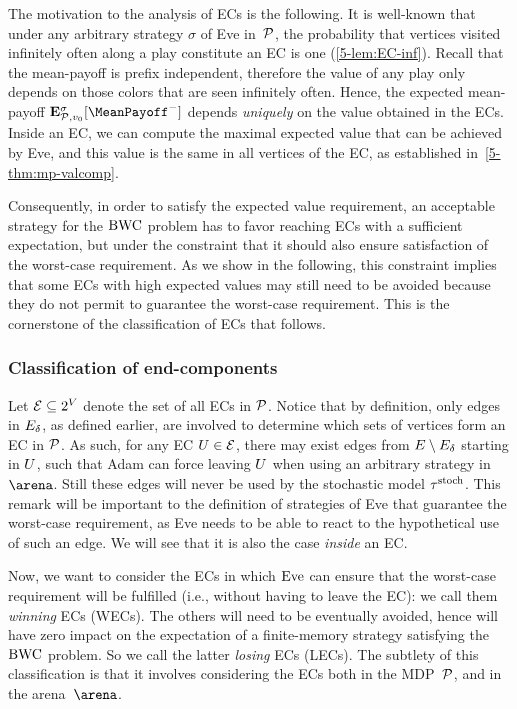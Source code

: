The motivation to the analysis of ECs is the following. It is well-known that under any arbitrary strategy $\sigma$ of Eve in~${\mathcal{P}} $, the probability that vertices visited infinitely often along a play constitute an EC is one (\cref{5-lem:EC-inf}). Recall that the mean-payoff is prefix independent, therefore the value of any play only depends on those colors that are seen infinitely often. Hence, the expected mean-payoff $\expv^{\sigma}_{\markovProcess,v_0}[\MeanPayoff^{-}]$ depends \textit{uniquely} on the value obtained in the ECs. Inside an EC, we can compute the maximal expected value that can be achieved by Eve, and this value is the same in all vertices of the EC, as established in~\cref{5-thm:mp-valcomp}.

Consequently, in order to satisfy the expected value requirement, an acceptable strategy for the $\text{BWC}$ problem has to favor reaching ECs with a sufficient expectation, but under the constraint that it should also ensure satisfaction of the worst-case requirement. As we show in the following, this constraint implies that some ECs with high expected values may still need to be avoided because they do not permit to guarantee the worst-case requirement. This is the cornerstone of the classification of ECs that follows.

\subsubsection*{Classification of end-components} Let $\mathcal{E} \subseteq 2^{V}$ denote the set of all ECs in ${\mathcal{P}} $. Notice that by definition, only edges in $E_{\delta}$, as defined earlier, are involved to determine which sets of vertices form an EC in ${\mathcal{P}} $. As such, for any EC $U \in \mathcal{E}$, there may exist edges from $E \setminus E_{\delta}$ starting in $U$, such that Adam can force leaving $U$ when using an arbitrary strategy in $\arena$. Still these edges will never be used by the stochastic model $\tau^{\text{stoch}} $. This remark will be important to the definition of strategies of Eve that guarantee the worst-case requirement, as Eve needs to be able to react to the hypothetical use of such an edge. We will see that it is also the case \textit{inside} an EC.

Now, we want to consider the ECs in which $\text{Eve}$ can ensure that the worst-case requirement will be fulfilled (i.e., without having to leave the EC): we call them \textit{winning} ECs (WECs). The others will need to be eventually avoided, hence will have zero impact on the expectation of a finite-memory strategy satisfying the $\text{BWC}$ problem. So we call the latter \textit{losing} ECs (LECs). The subtlety of this classification is that it involves considering the ECs both in the MDP~${\mathcal{P}} $, and in the arena~$\arena$.

